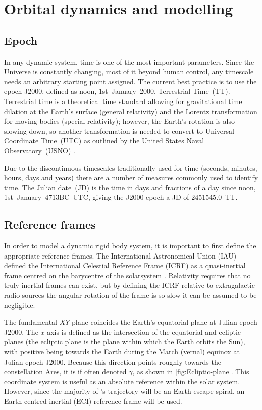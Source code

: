 \chapter{Orbital dynamics and modelling} \label{cha:Orbital-dynamics-and-modelling}

\section{Epoch} \label{sec:Epoch}

In any dynamic system, time is one of the most important parameters. Since the Universe is constantly changing, most of it beyond human control, any timescale needs an arbitrary starting point assigned. The current best practice is to use the epoch J2000, defined as noon, 1st~January~2000, Terrestrial Time~(TT). Terrestrial time is a theoretical time standard allowing for gravitational time dilation at the Earth's surface (general relativity) and the Lorentz transformation for moving bodies (special relativity); however, the Earth's rotation is also slowing down, so another transformation is needed to convert to Universal Coordinate Time~(UTC) as outlined by the United States Naval Observatory~(USNO) \textcite{web_TimeServiceDept.2008}.

Due to the discontinuous timescales traditionally used for time (seconds, minutes, hours, days and years) there are a number of measures commonly used to identify time. The Julian date~(JD) is the time in days and fractions of a day since noon, 1st~January~4713BC~UTC, giving the J2000 epoch a JD of 2451545.0~TT.




\section{Reference frames} \label{sec:Reference-frames}

In order to model a dynamic rigid body system, it is important to first define the appropriate reference frames. The International Astronomical Union (IAU) defined the International Celestial Reference Frame (ICRF) as a quasi-inertial frame centred on the barycentre of the solarsystem \parencite{Montenbruck2000}. %
Relativity requires that no truly inertial frames can exist, but by defining the ICRF relative to extragalactic radio sources the angular rotation of the frame is so slow it can be assumed to be negligible.

The fundamental $XY$ plane coincides the Earth's equatorial plane at Julian epoch J2000. The $x$-axis is defined as the intersection of the equatorial and ecliptic planes (the ecliptic plane is the plane within which the Earth orbits the Sun), with positive being towards the Earth during the March (vernal) equinox at Julian epoch J2000. Because this direction points roughly towards the constellation Ares, it is if often denoted $\gamma$, as shown in \autoref{fig:Ecliptic-plane}. This coordinate system is useful as an absolute reference within the solar system. However, since the majority of \BW's trajectory will be an Earth escape spiral, an Earth-centred inertial (ECI) reference frame will be used.

